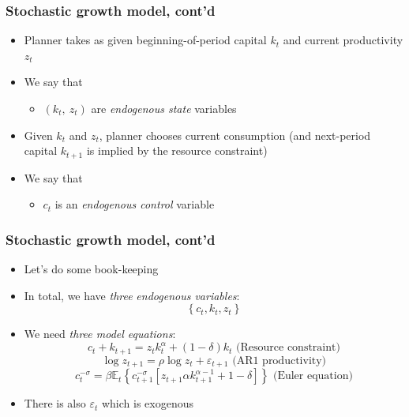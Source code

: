 \documentclass{beamer}
\begin{document}
\begin{frame}
\frametitle{Stochastic growth model, cont'd}

\begin{itemize}
\item Planner takes as given beginning-of-period capital $k_{t}$ and current productivity $z_{t}$
\item We say that 
\begin{itemize}
	\item $\left( k_{t},\ z_{t}\right) $ are \textit{endogenous state} variables
\end{itemize}

\item Given $k_{t}$ and $z_{t}$, planner chooses current consumption (and next-period capital $k_{t+1}$ is implied by the resource constraint)
\item We say that
\begin{itemize}
	\item $c_{t}$ is an \textit{endogenous control} variable
\end{itemize}
\end{itemize}

\end{frame}

\begin{frame}
\frametitle{Stochastic growth model, cont'd}

\begin{itemize}
\item Let's do some book-keeping

\item In total, we have \textit{three} \textit{endogenous variables}:%
\begin{equation*}
\left\{ c_{t},k_{t},z_{t}\right\} 
\end{equation*}

\item We need \textit{three model equations}:%
\begin{equation*}
c_{t}+k_{t+1}=z_{t}k_{t}^{\alpha }+(1-\delta )k_{t}\text{ (Resource
constraint)}
\end{equation*}%
\begin{equation*}
\log z_{t+1}=\rho \log z_{t}+\varepsilon _{t+1}\text{ (AR1 productivity)}
\end{equation*}%
\begin{equation*}
c_{t}^{-\sigma }=\beta \mathbb{E}_{t}\left\{ c_{t+1}^{-\sigma }\left[
z_{t+1}\alpha k_{t+1}^{\alpha -1}+1-\delta \right] \right\} \text{ (Euler
equation)}
\end{equation*}

\item There is also $\varepsilon _{t}$ which is exogenous
\end{itemize}
\end{frame}
\end{document}

